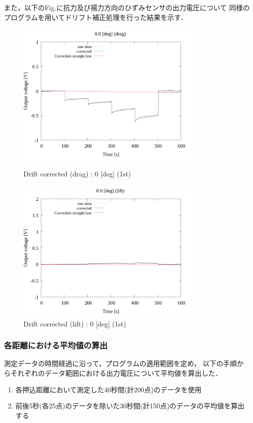 また，以下のFig.に抗力及び揚力方向のひずみセンサの出力電圧について
同様のプログラムを用いてドリフト補正処理を行った結果を示す．

\begin{figure}[htbp]
	\footnotesize
	\begin{center}
		\includegraphics[width=95mm]{../../02_workspace/result/2-1/plot/02-2_drag/02_drag-drift_0.png}
		\caption{Drift corrected (drag) : 0 [deg] (1st)}
		\includegraphics[width=95mm]{../../02_workspace/result/2-1/plot/02-3_lift/02_lift-drift_0.png}
		\caption{Drift corrected (lift) : 0 [deg] (1st)}
	\end{center}
\end{figure}

\newpage

\subsubsection{各距離における平均値の算出}

測定データの時間経過に沿って，プログラムの適用範囲を定め，
以下の手順からそれぞれのデータ範囲における出力電圧について平均値を算出した．

\begin{enumerate}[(1)]
	\item 各押込距離において測定した40秒間(計200点)のデータを使用
	\item 前後5秒(各25点)のデータを除いた30秒間(計150点)のデータの平均値を算出する
\end{enumerate}

